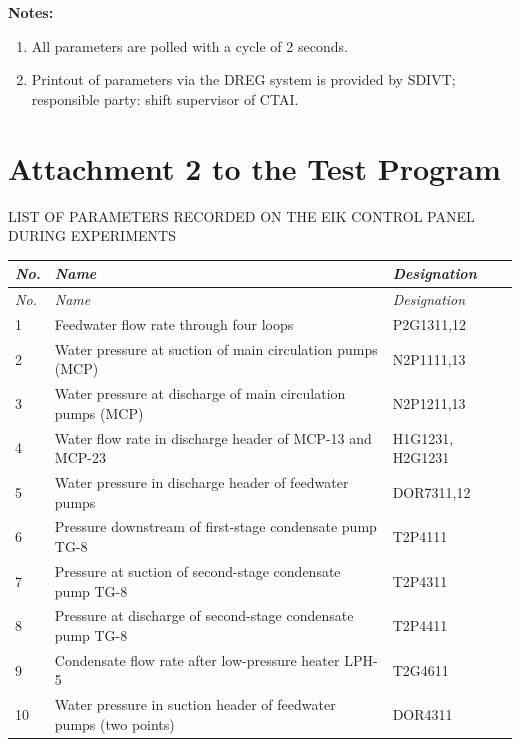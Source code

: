 \documentclass[openright]{bookest}
\begin{document}
\medskip
\textbf{Notes:}
\begin{enumerate}
  \item All parameters are polled with a cycle of 2 seconds.
  \item Printout of parameters via the DREG system is provided by SDIVT; responsible party: shift supervisor of CTAI.
\end{enumerate}

\section*{Attachment 2 to the Test Program}

\begin{center}
  LIST OF PARAMETERS RECORDED ON THE EIK CONTROL PANEL DURING EXPERIMENTS
\end{center}

\small
\begin{center}
\begin{longtable}{|p{3em}|p{16em}|p{7em}|}
\hline
\textit{No.} &
\textit{Name} &
\textit{Designation} \\
\hline
\endfirsthead

\hline
\textit{No.} &
\textit{Name} &
\textit{Designation} \\
\hline
\endhead

1 &
Feedwater flow rate through four loops &
P2G1311,12 \\
\hline

2 &
Water pressure at suction of main circulation pumps (MCP) &
N2P1111,13 \\
\hline

3 &
Water pressure at discharge of main circulation pumps (MCP) &
N2P1211,13 \\
\hline

4 &
Water flow rate in discharge header of MCP-13 and MCP-23 &
H1G1231, H2G1231 \\
\hline

5 &
Water pressure in discharge header of feedwater pumps &
DOR7311,12 \\
\hline

6 &
Pressure downstream of first-stage condensate pump TG-8 &
T2P4111 \\
\hline

7 &
Pressure at suction of second-stage condensate pump TG-8 &
T2P4311 \\
\hline

8 &
Pressure at discharge of second-stage condensate pump TG-8 &
T2P4411 \\
\hline

9 &
Condensate flow rate after low-pressure heater LPH-5 &
T2G4611 \\
\hline

10 &
Water pressure in suction header of feedwater pumps (two points) &
DOR4311 \\
\hline

\end{longtable}
\end{center}\normalsize
\end{document}
